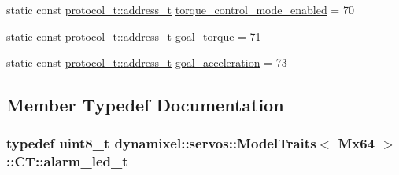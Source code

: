 \begin{DoxyCompactItemize}
\item 
static const \hyperlink{classdynamixel_1_1protocols_1_1_protocol1_a4383ba392b57ea00dd0273c6da5e8a65}{protocol\+\_\+t\+::address\+\_\+t} \hyperlink{structdynamixel_1_1servos_1_1_model_traits_3_01_mx64_01_4_1_1_c_t_ac1ebc5d82a076745062a6656ae09eebe}{torque\+\_\+control\+\_\+mode\+\_\+enabled} = 70
\item 
static const \hyperlink{classdynamixel_1_1protocols_1_1_protocol1_a4383ba392b57ea00dd0273c6da5e8a65}{protocol\+\_\+t\+::address\+\_\+t} \hyperlink{structdynamixel_1_1servos_1_1_model_traits_3_01_mx64_01_4_1_1_c_t_a56999131b7aa5df5d3c6e95ad4133609}{goal\+\_\+torque} = 71
\item 
static const \hyperlink{classdynamixel_1_1protocols_1_1_protocol1_a4383ba392b57ea00dd0273c6da5e8a65}{protocol\+\_\+t\+::address\+\_\+t} \hyperlink{structdynamixel_1_1servos_1_1_model_traits_3_01_mx64_01_4_1_1_c_t_a0ba7ef75b82682edba4cf19861063ea2}{goal\+\_\+acceleration} = 73
\end{DoxyCompactItemize}


\subsection{Member Typedef Documentation}
\hypertarget{structdynamixel_1_1servos_1_1_model_traits_3_01_mx64_01_4_1_1_c_t_a167cb35aa41c242252f5eb9fb1b5dcfa}{}
\subsubsection[{alarm\+\_\+led\+\_\+t}]{\setlength{\rightskip}{0pt plus 5cm}typedef uint8\+\_\+t {\bf dynamixel\+::servos\+::\+Model\+Traits}$<$ {\bf Mx64} $>$\+::{\bf C\+T\+::alarm\+\_\+led\+\_\+t}}\label{structdynamixel_1_1servos_1_1_model_traits_3_01_mx64_01_4_1_1_c_t_a167cb35aa41c242252f5eb9fb1b5dcfa}
\hypertarget{structdynamixel_1_1servos_1_1_model_traits_3_01_mx64_01_4_1_1_c_t_ae7feb1f58c3e2d8c06eb3a6fc4cd2e5b}{}

